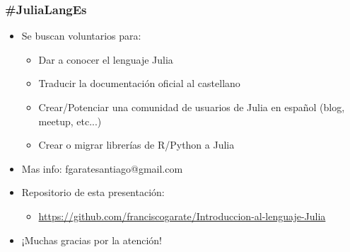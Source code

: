 \documentclass{beamer}
\begin{document}
\begin{frame}
\frametitle{\#JuliaLangEs}
\begin{itemize}
	\item Se buscan voluntarios para:
	\begin{itemize}
		\item Dar a conocer el lenguaje Julia 
		\item Traducir la documentación oficial al castellano
		\item Crear/Potenciar una comunidad de usuarios de Julia en español (blog, meetup, etc...)
		\item Crear o migrar librerías de R/Python a Julia
	\end{itemize}
	\item Mas info: fgaratesantiago@gmail.com
	\item Repositorio de esta presentación:
	\begin{itemize}
	\item \url{https://github.com/franciscogarate/Introduccion-al-lenguaje-Julia}
	\end{itemize}
	\item ¡Muchas gracias por la atención!
\end{itemize}
\end{frame}

\end{document}
